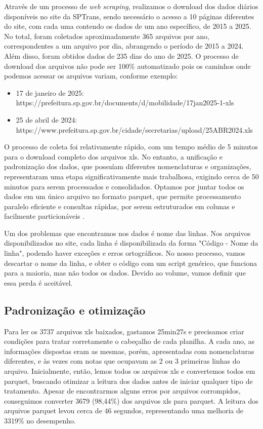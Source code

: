 Através de um processo de \textit{web scraping}, realizamos o download dos dados diários disponíveis no site da SPTrans, sendo necessário o acesso a 10 páginas diferentes do site, com cada uma contendo os dados de um ano específico, de 2015 a 2025. No total, foram coletados aproximadamente 365 arquivos por ano, correspondentes a um arquivo por dia, abrangendo o período de 2015 a 2024. Além disso, foram obtidos dados de 235 dias do ano de 2025. O processo de download dos arquivos não pode ser 100\% automatizado pois os caminhos onde podemos acessar os arquivos variam, conforme exemplo:

\begin{itemize}
    \item 17 de janeiro de 2025: https://prefeitura.sp.gov.br/documents/d/mobilidade/17jan2025-1-xls
    \item 25 de abril de 2024: https://www.prefeitura.sp.gov.br/cidade/secretarias/upload/25ABR2024.xls
    
\end{itemize}

O processo de coleta foi relativamente rápido, com um tempo médio de 5 minutos para o download completo dos arquivos xls. No entanto, a unificação e padronização dos dados, que possuíam diferentes nomenclaturas e organizações, representaram uma etapa significativamente mais trabalhosa, exigindo cerca de 50 minutos para serem processados e consolidados. Optamos por juntar todos os dados em um único arquivo no formato parquet, que permite processamento paralelo eficiente e consultas rápidas, por serem estruturados em colunas e facilmente particionáveis \citep{parquet_optimization}.

Um dos problemas que encontramos nos dados é nome das linhas. Nos arquivos disponibilizados no site, cada linha é disponibilizada da forma "Código - Nome da linha", podendo haver exceções e erros ortográficos. No nosso processo, vamos descartar o nome da linha, e obter o código com um script genérico, que funciona para a maioria, mas não todos os dados. Devido ao volume, vamos definir que essa perda é aceitável.

\subsection{Padronização e otimização}

Para ler os 3737 arquivos xls baixados, gastamos 25min27s e precisamos criar condições para tratar corretamente o cabeçalho de cada planilha. A cada ano, as informações dispostas eram as mesmas, porém, apresentadas com nomenclaturas diferentes, e às vezes com notas que ocupavam as 2 ou 3 primeiras linhas do arquivo. Inicialmente, então, lemos todos os arquivos xls e convertemos todos em parquet, buscando otimizar a leitura dos dados antes de iniciar qualquer tipo de tratamento. Apesar de encontrarmos alguns erros por arquivos corrompidos, conseguimos converter 3679 (98,44\%) dos arquivos xls para parquet. A leitura dos arquivos parquet levou cerca de 46 segundos, representando uma melhoria de 3319\% no desempenho.

